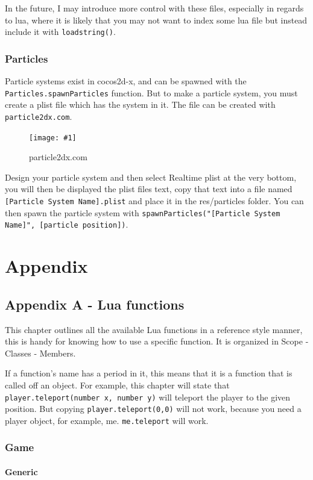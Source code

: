 \documentclass{book}
\newcommand{\hFigure}[2]
	{\begin{figure}[ht!]
		\centering
		\texttt{[image: \#1]}
		\caption{#2}
	\end{figure}}
\begin{document}
In the future, I may introduce more control with these files, especially in regards to lua, where it is likely that you may not want to index some lua file but instead include it with \texttt{loadstring()}.

\section{Particles}
Particle systems exist in cocos2d-x, and can be spawned with the \texttt{Particles.spawnParticles} function. But to make a particle system, you must create a plist file which has the system in it. The file can be created with \texttt{particle2dx.com}.

\hFigure{ParticleCreator.png}{particle2dx.com}

Design your particle system and then select Realtime plist at the very bottom, you will then be displayed the plist files text, copy that text into a file named \texttt{[Particle System Name].plist} and place it in the res/particles folder. You can then spawn the particle system with \texttt{spawnParticles("[Particle System Name]", [particle position])}.

\part{Appendix}
\chapter{Appendix A - Lua functions}
This chapter outlines all the available Lua functions in a reference style manner, this is handy for knowing how to use a specific function. It is organized in Scope - Classes - Members.

If a function's name has a period in it, this means that it is a function that is called off an object. For example, this chapter will state that \texttt{player.teleport(number x, number y)} will teleport the player to the given position. But copying \texttt{player.teleport(0,0)} will not work, because you need a player object, for example, me. \texttt{me.teleport} will work.

\section{Game}

\subsection{Generic}
\end{document}
